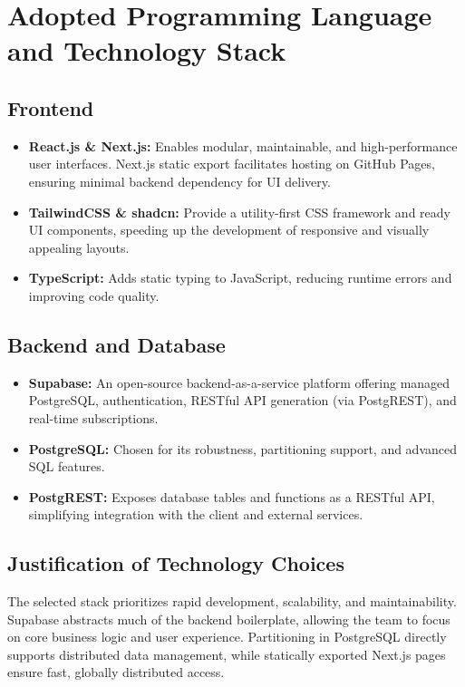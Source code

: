 \documentclass[12pt,a4paper]{report}
\begin{document}
\chapter{Adopted Programming Language and Technology Stack}
\section{Frontend}
\begin{itemize}
    \item \textbf{React.js \& Next.js:} Enables modular, maintainable, and high-performance user interfaces. Next.js static export facilitates hosting on GitHub Pages, ensuring minimal backend dependency for UI delivery.
    \item \textbf{TailwindCSS \& shadcn:} Provide a utility-first CSS framework and ready UI components, speeding up the development of responsive and visually appealing layouts.
    \item \textbf{TypeScript:} Adds static typing to JavaScript, reducing runtime errors and improving code quality.
\end{itemize}

\section{Backend and Database}
\begin{itemize}
    \item \textbf{Supabase:} An open-source backend-as-a-service platform offering managed PostgreSQL, authentication, RESTful API generation (via PostgREST), and real-time subscriptions.
    \item \textbf{PostgreSQL:} Chosen for its robustness, partitioning support, and advanced SQL features.
    \item \textbf{PostgREST:} Exposes database tables and functions as a RESTful API, simplifying integration with the client and external services.
\end{itemize}

\section{Justification of Technology Choices}
The selected stack prioritizes rapid development, scalability, and maintainability. Supabase abstracts much of the backend boilerplate, allowing the team to focus on core business logic and user experience. Partitioning in PostgreSQL directly supports distributed data management, while statically exported Next.js pages ensure fast, globally distributed access.
\end{document}
